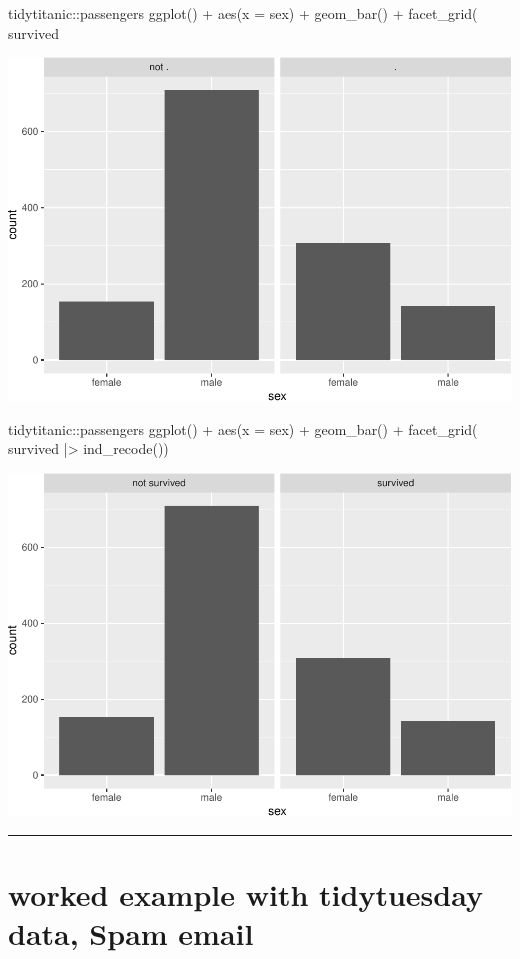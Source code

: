 \begin{Schunk}
\begin{Sinput}
tidytitanic::passengers %
ggplot() + 
  aes(x = sex) + 
  geom_bar() + 
  facet_grid(~ survived %
\end{Sinput}

\includegraphics[width=0.69\linewidth]{r_journal_files/figure-latex/unnamed-chunk-14-1} \begin{Sinput}
tidytitanic::passengers %
ggplot() + 
  aes(x = sex) + 
  geom_bar() + 
  facet_grid(~ survived |> ind_recode())
\end{Sinput}

\includegraphics[width=0.69\linewidth]{r_journal_files/figure-latex/unnamed-chunk-14-2} \end{Schunk}

\begin{center}\rule{0.5\linewidth}{0.5pt}\end{center}

\hypertarget{worked-example-with-tidytuesday-data-spam-email}{%
\section{worked example with tidytuesday data, Spam
email}\label{worked-example-with-tidytuesday-data-spam-email}}

